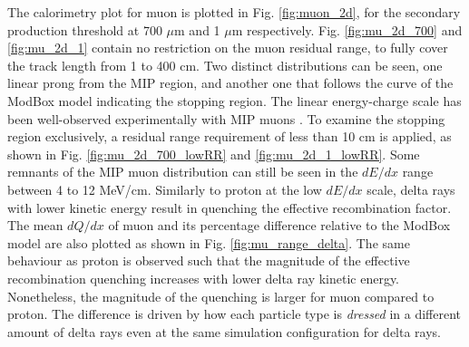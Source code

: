 The calorimetry plot for muon is plotted in Fig. \ref{fig:muon_2d}, for the secondary production threshold at 700 $\mu$m and 1 $\mu$m respectively.
 Fig. \ref{fig:mu_2d_700} and \ref{fig:mu_2d_1} contain no restriction on the muon residual range, to fully cover the track length from 1 to 400 cm.
Two distinct distributions can be seen, one linear prong from the MIP region, and another one that follows the curve of the ModBox model indicating the stopping region. 
The linear energy-charge scale has been well-observed experimentally with MIP muons \cite{uboone_calib}.
To examine the stopping region exclusively, a residual range requirement of less than 10 cm is applied, as shown in Fig. \ref{fig:mu_2d_700_lowRR} and \ref{fig:mu_2d_1_lowRR}.
Some remnants of the MIP muon distribution can still be seen in the $dE/dx$ range between 4 to 12 MeV/cm.
Similarly to proton at the low $dE/dx$ scale, delta rays with lower kinetic energy result in quenching the effective recombination factor.
The mean $dQ/dx$ of muon and its percentage difference relative to the ModBox model are also plotted as shown in Fig. \ref{fig:mu_range_delta}.
The same behaviour as proton is observed such that the magnitude of the effective recombination quenching increases with lower delta ray kinetic energy.
Nonetheless, the magnitude of the quenching is larger for muon compared to proton.
The difference is driven by how each particle type is \textit{dressed} in a different amount of delta rays even at the same simulation configuration for delta rays.

